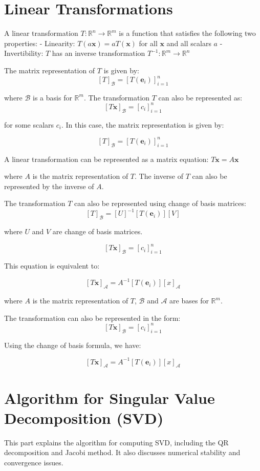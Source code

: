 \documentclass{report}%
\begin{document}
%
\section{Linear Transformations}

A linear transformation $T: \mathbb{R}^n \to \mathbb{R}^m$ is a function that satisfies the following two properties:
- Linearity: $T(a \mathbf{x}) = a T(\mathbf{x})$ for all $\mathbf{x}$ and all scalars $a$
- Invertibility: $T$ has an inverse transformation $T^{-1}: \mathbb{R}^m \to \mathbb{R}^n$

The matrix representation of $T$ is given by:
$$
[T]_{\mathcal{B}} = [T(\mathbf{e}_i)]_{i=1}^{n}
$$

where $\mathcal{B}$ is a basis for $\mathbb{R}^m$. The transformation $T$ can also be represented as:
$$
[T \mathbf{x}]_{\mathcal{B}} = [c_i]_{i=1}^{n}
$$

for some scalars $c_i$. In this case, the matrix representation is given by:

$$
[T]_{\mathcal{B}} = [T(\mathbf{e}_i)]_{i=1}^{n}
$$

A linear transformation can be represented as a matrix equation:
$T \mathbf{x} = A \mathbf{x}$

where $A$ is the matrix representation of $T$. The inverse of $T$ can also be represented by the inverse of $A$.

The transformation $T$ can also be represented using change of basis matrices:
$$
[T]_{\mathcal{B}} = [U]^{-1} [T(\mathbf{e}_i)] [V]
$$

where $U$ and $V$ are change of basis matrices. 

$$
[T \mathbf{x}]_{\mathcal{B}} = [c_i]_{i=1}^{n}
$$

This equation is equivalent to:

$$
[T \mathbf{x}]_{\mathcal{A}} = A^{-1} [T(\mathbf{e}_i)] [x]_{\mathcal{A}}
$$

where $A$ is the matrix representation of $T$, $\mathcal{B}$ and $\mathcal{A}$ are bases for $\mathbb{R}^m$. 

The transformation can also be represented in the form:
$$
[T \mathbf{x}]_{\mathcal{B}} = [c_i]_{i=1}^{n}
$$

Using the change of basis formula, we have:

$$
[T \mathbf{x}]_{\mathcal{A}} = A^{-1} [T(\mathbf{e}_i)] [x]_{\mathcal{A}}
$$%
\section{Algorithm for Singular Value Decomposition (SVD)}%
This part explains the algorithm for computing SVD, including the QR decomposition and Jacobi method. It also discusses numerical stability and convergence issues.
\end{document}
